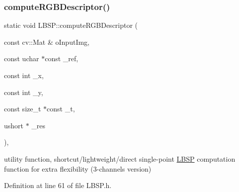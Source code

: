 \subsubsection{\texorpdfstring{compute\+R\+G\+B\+Descriptor()}{computeRGBDescriptor()}\hspace{0.1cm}{\footnotesize\ttfamily [1/2]}}
{\footnotesize\ttfamily static void L\+B\+S\+P\+::compute\+R\+G\+B\+Descriptor (\begin{DoxyParamCaption}\item[{const cv\+::\+Mat \&}]{o\+Input\+Img,  }\item[{const uchar $\ast$const}]{\+\_\+ref,  }\item[{const int}]{\+\_\+x,  }\item[{const int}]{\+\_\+y,  }\item[{const size\+\_\+t $\ast$const}]{\+\_\+t,  }\item[{ushort $\ast$}]{\+\_\+res }\end{DoxyParamCaption})\hspace{0.3cm}{\ttfamily [inline]}, {\ttfamily [static]}}



utility function, shortcut/lightweight/direct single-\/point \mbox{\hyperlink{class_l_b_s_p}{L\+B\+SP}} computation function for extra flexibility (3-\/channels version) 



Definition at line 61 of file L\+B\+S\+P.\+h.


